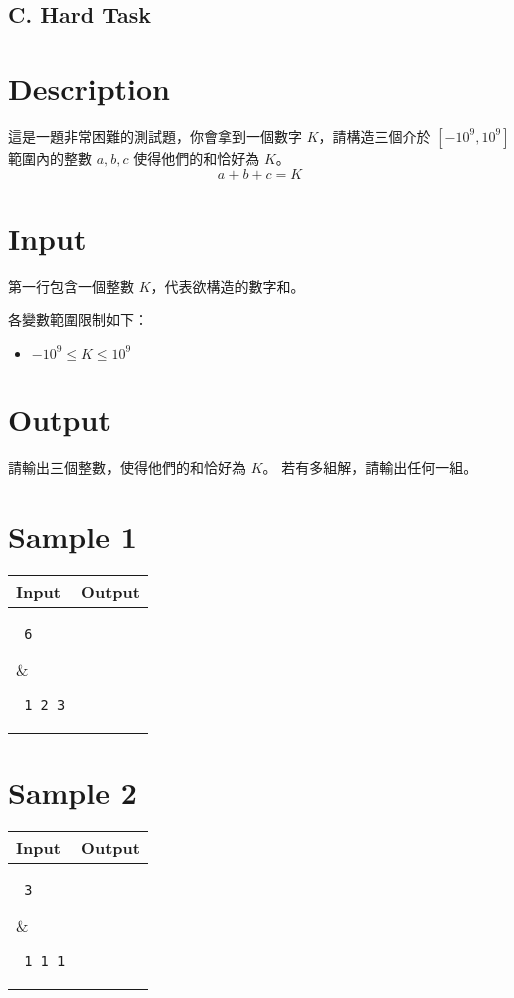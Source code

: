 \documentclass[11pt,a4paper]{article}
\begin{document}
\begin{center}
\section*{C. Hard Task}
\end{center}

\section*{Description}

這是一題非常困難的測試題，你會拿到一個數字 $K$，請構造三個介於 $[-10^9, 10^9]$ 範圍內的整數 $a, b, c$ 使得他們的和恰好為 $K$。
$$
	a + b + c = K
$$

\section*{Input}

第一行包含一個整數 $K$，代表欲構造的數字和。 

各變數範圍限制如下：
\begin{itemize}
	\item $-10^9 \le K \le 10^9$
\end{itemize}

\section*{Output}

請輸出三個整數，使得他們的和恰好為 $K$。
若有多組解，請輸出任何一組。

\section*{Sample 1}
\begin{longtable}[!h]{|p{}|p{}|}
\hline
\textbf {Input}	& \textbf {Output} \\
\hline
\parbox[t]{0.5\textwidth} %
{ \tt
6 \\
} &
\parbox[t]{0.5\textwidth}
{ \tt
1 2 3 \\
} \\
\hline
\end{longtable}

\section*{Sample 2}
\begin{longtable}[!h]{|p{}|p{}|}
\hline
\textbf {Input}	& \textbf {Output} \\
\hline
\parbox[t]{0.5\textwidth} %
{ \tt
3 \\
} &
\parbox[t]{0.5\textwidth}
{ \tt
1 1 1 \\
} \\
\hline
\end{longtable}
\end{document}
